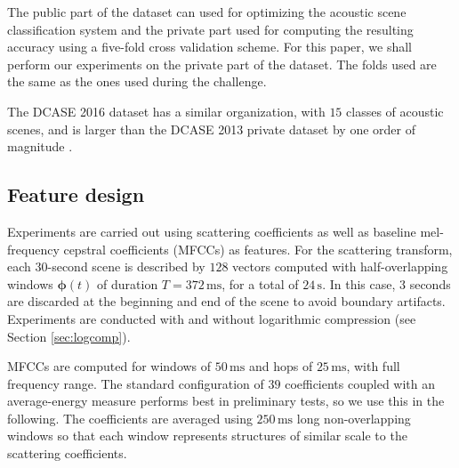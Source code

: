 \documentclass[journal]{IEEEtran}
\newcommand{\ja}[1]{\textcolor{magenta}{Joakim : #1}}
\begin{document}
The public part of the dataset can used for optimizing the acoustic scene classification system and the private part used for computing the resulting accuracy using a five-fold cross validation scheme. For this paper, we shall perform our experiments on the private part of the dataset. The folds used are the same as the ones used during the challenge. 

The DCASE 2016 dataset has a similar organization, with $15$ classes of acoustic scenes, and is larger than the DCASE 2013 private dataset by one order of magnitude \cite{Mesaros2016_EUSIPCO}.



\subsection{Feature design}

Experiments are carried out using scattering coefficients as well as baseline mel-frequency cepstral coefficients (MFCCs) as features. For the scattering transform, each $30$-second scene is described by $128$ vectors computed with half-overlapping windows $\boldsymbol{\phi}(t)$ of duration $T=372\,\mathrm{ms}$, for a total of $24\,\mathrm{s}$. In this case, $3$ seconds are discarded at the beginning and end of the scene to avoid boundary artifacts. Experiments are conducted with and without logarithmic compression (see Section \ref{sec:logcomp}).

MFCCs are computed for windows of $50\,\mathrm{ms}$ and hops of $25\,\mathrm{ms}$, with full frequency range. The standard configuration of $39$ coefficients coupled with an average-energy measure performs best in preliminary tests, so we use this in the following. The coefficients are averaged using $250\,\mathrm{ms}$ long non-overlapping windows so that each window represents structures of similar scale to the scattering coefficients.
\end{document}
